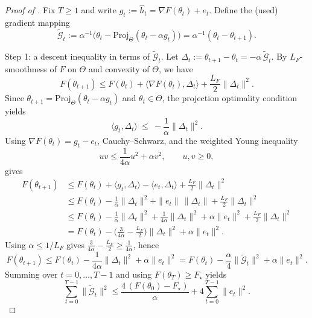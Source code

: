 \documentclass[10pt,a4paper]{amsart}
\providecommand{\paragraph}{}
\begin{document}
\begin{proof}[Proof of ]
Fix $T\ge 1$ and write $g_t:=\widehat h_t=\nabla F(\theta_t)+e_t$.
Define the (used) gradient mapping
\[
\widetilde{\mathcal G}_t
:=\alpha^{-1}\big(\theta_t-\mathrm{Proj}_{\Theta}(\theta_t-\alpha g_t)\big)
=\alpha^{-1}(\theta_t-\theta_{t+1}).
\]

\paragraph{Step 1: a descent inequality in terms of $\widetilde{\mathcal G}_t$.}
Let $\Delta_t:=\theta_{t+1}-\theta_t=-\alpha\,\widetilde{\mathcal G}_t$.
By $L_F$-smoothness of $F$ on $\Theta$ and convexity of $\Theta$, we have
\[
F(\theta_{t+1})
\le
F(\theta_t)+\langle \nabla F(\theta_t),\Delta_t\rangle+\frac{L_F}{2}\|\Delta_t\|^2.
\]
Since $\theta_{t+1}=\mathrm{Proj}_{\Theta}(\theta_t-\alpha g_t)$ and $\theta_t\in\Theta$, the projection
optimality condition yields
\[
\langle g_t,\Delta_t\rangle\ \le\ -\frac{1}{\alpha}\|\Delta_t\|^2.
\]
	Using $\nabla F(\theta_t)=g_t-e_t$, Cauchy--Schwarz, and the weighted Young inequality
	\[
	uv\le \frac{1}{4\alpha}u^2+\alpha v^2,\qquad u,v\ge0,
	\]
	gives
\begin{align*}
F(\theta_{t+1})
&\le
F(\theta_t)+\langle g_t,\Delta_t\rangle-\langle e_t,\Delta_t\rangle+\frac{L_F}{2}\|\Delta_t\|^2\\
&\le
F(\theta_t)-\frac{1}{\alpha}\|\Delta_t\|^2+\|e_t\|\,\|\Delta_t\|+\frac{L_F}{2}\|\Delta_t\|^2\\
&\le
F(\theta_t)-\frac{1}{\alpha}\|\Delta_t\|^2+\frac{1}{4\alpha}\|\Delta_t\|^2+\alpha\|e_t\|^2+\frac{L_F}{2}\|\Delta_t\|^2\\
&=
F(\theta_t)-\Big(\frac{3}{4\alpha}-\frac{L_F}{2}\Big)\|\Delta_t\|^2+\alpha\|e_t\|^2.
\end{align*}
Using $\alpha\le 1/L_F$ gives $\frac{3}{4\alpha}-\frac{L_F}{2}\ge \frac{1}{4\alpha}$, hence
\[
F(\theta_{t+1})
\le
F(\theta_t)-\frac{1}{4\alpha}\|\Delta_t\|^2+\alpha\|e_t\|^2
=
F(\theta_t)-\frac{\alpha}{4}\|\widetilde{\mathcal G}_t\|^2+\alpha\|e_t\|^2.
\]
Summing over $t=0,\dots,T-1$ and using $F(\theta_T)\ge F_\star$ yields
\begin{equation}\label{eq:sum-Gtilde}
\sum_{t=0}^{T-1}\|\widetilde{\mathcal G}_t\|^2
\le
\frac{4\,(F(\theta_0)-F_\star)}{\alpha}
+4\sum_{t=0}^{T-1}\|e_t\|^2.
\end{equation}


\end{proof}
\end{document}
